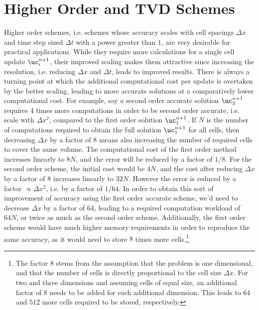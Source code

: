 \chapter{Higher Order and TVD Schemes}\label{chap:higher-order-schemes}


Higher order schemes, i.e. schemes whose accuracy scales with cell spacings $\Delta x$ and time
step sized $\Delta t$ with a power greater than $1$, are very desirable for practical applications.
While they require more calculations for a single cell update $\uc^{n+1}_i$, their improved scaling
makes them attractive since increasing the resolution, i.e. reducing $\Delta x$ and $\Delta t$,
leads to improved results. There is always a turning point at which the additional computational
cost per update is overtaken by the better scaling, leading to more accurate solutions at a
comparatively lower computational cost. For example, say a second order accurate solution
$\uc_{2}^{n+1}$ requires 4 times more computations in order to be second order accurate, i.e. scale
with $\Delta x^2$, compared to the first order solution $\uc_{1}^{n+1}$. If $N$ is the number of
computations required to obtain the full solution $\uc_{1}^{n+1}$ for all cells, then decreasing
$\Delta x$ by a factor of $8$ means also increasing the number of required cells to cover the same
volume. The computational cost of the first order method increases linearly to $8N$, and the error
will be reduced by a factor of $1/8$. For the second order scheme, the initial cost would be $4 N$,
and the cost after reducing $\Delta x$ by a factor of $8$ increases linearly to $32 N$. However the
error is reduced by a factor $\propto \Delta x^2$, i.e. by a factor of $1/64$. In order to obtain
this sort of improvement of accuracy using the first order accurate scheme, we'd need to decrease
$\Delta x$ by a factor of $64$, leading to a required computation workload of $64 N$, or twice as
much as the second order scheme. Additionally, the first order scheme would have much higher memory
requirements in order to reproduce the same accuracy, as it would need to store $8$ times more
cells.\footnote{The factor 8 stems from the assumption that the problem is one dimensional, and
that the number of cells is directly proportional to the cell size $\Delta x$. For two and three
dimensions and assuming cells of equal size, an additional factor of $8$ needs to be added
for each additional dimension. This leads to $64$ and $512$ more cells required to be stored,
respectively.}


